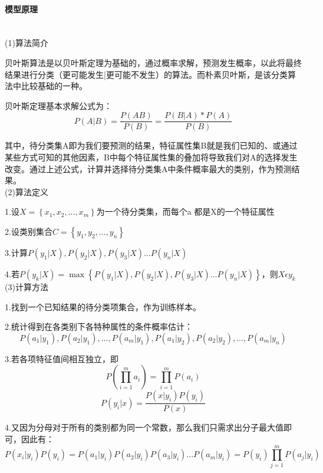 \documentclass[UTF8,12pt,songti]{ctexart}
\begin{document}
\paragraph{模型原理} \quad \\
(1)算法简介\par
贝叶斯算法是以贝叶斯定理为基础的，通过概率求解，预测发生概率，以此将最终结果进行分类（更可能发生|更可能不发生）的算法。而朴素贝叶斯，是该分类算法中比较基础的一种。\par
贝叶斯定理基本求解公式为：
\begin{equation}\label{bayes1}
P(A\big|B)=\frac{P(AB)}{P(B)}=\frac{P(B\big|A)*P(A)}{P(B)}
\end{equation}
\par 其中，待分类集A即为我们要预测的结果，特征属性集B就是我们已知的、或通过某些方式可知的其他因素，B中每个特征属性集的叠加将导致我们对A的选择发生改变。通过上述公式，计算并选择待分类集A中条件概率最大的类别，作为预测结果。\\
(2)算法定义 \par
1.设$X=\left \{ x_{1},x_{2},...,x_{m} \right \}$为一个待分类集，而每个a 都是X的一个特征属性\par
2.设类别集合$C=\left \{ y_{1},y_{2},...,y_{n} \right \}$ \par
3.计算$P(y_{1}\big|X),P(y_{2}\big|X),P(y_{3}\big|X)$...$P(y_{n}\big|X)$ \par
4.若$P(y_{k}\big|X)=\max\left \{ P(y_{1}\big|X),P(y_{2}\big|X),P(y_{3}\big|X)...P(y_{n}\big|X) \right \} $，则$ X \epsilon y_{k}$  \\
(3)计算方法  \par
1.找到一个已知结果的待分类项集合，作为训练样本。\par
2.统计得到在各类别下各特种属性的条件概率估计：\[P(a_{1}\big|y_{1}),P(a_{2}\big|y_{1}),...,P(a_{m}\big|y_{1}),P(a_{1}\big|y_{2}),P(a_{2}\big|y_{2}),...,P(a_{m}\big|y_{n})\] \par
3.若各项特征值间相互独立，即
\begin{equation}\label{bayes2}
  P(\prod_{i=1}^{m}a_{i})=\prod_{i=1}^{m}P(a_{i})
\end{equation}
\begin{equation}\label{bayes3}
  P(y_{i}\big|x)=\frac{P(x\big|y_{i})P(y_{i})}{P(x)}
\end{equation}
\par
4.又因为分母对于所有的类别都为同一个常数，那么我们只需求出分子最大值即可，因此有：
\begin{equation}\label{bayes4}
 P(x_{i}\big|y_{i})P(y_{i})=P(a_{1}\big|y_{i})P(a_{2}\big|y_{i})P(a_{3}\big|y_{i})...P(a_{m}\big|y_{i})=P(y_{i})\prod_{j=1}^{m}P(a_{j}\big|y_{i})
\end{equation}
\end{document}
